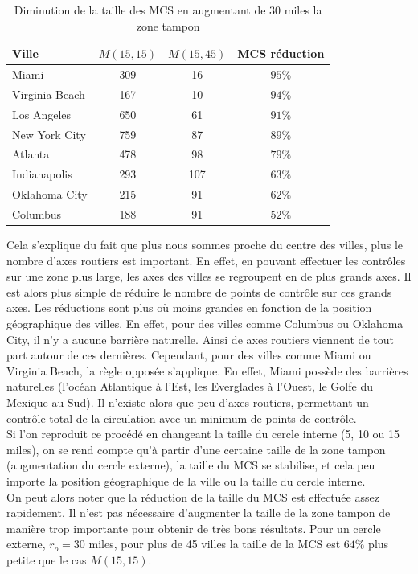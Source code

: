 \begin{table}[H]
 \centering
 \begin{tabular}{|l|c|c|c|}
    \toprule
    \textbf{Ville} & \textbf{$M(15,15)$} & \textbf{$M(15,45)$} & \textbf{MCS réduction}\\\midrule
    Miami & 309 & 16 & $95\%$ \\\hline
    Virginia Beach & 167 & 10 & $94\%$ \\\hline
    Los Angeles & 650 & 61 & $91\%$ \\\hline
    New York City & 759 & 87 & $89\%$ \\\hline
    Atlanta & 478 & 98 & $79\%$ \\\hline
    Indianapolis & 293 & 107 & $63\%$ \\\hline
    Oklahoma City & 215 & 91 & $62\%$ \\\hline
    Columbus & 188 & 91 & $52\%$ \\\bottomrule
 \end{tabular}
 \caption{Diminution de la taille des MCS en augmentant de 30 miles la zone tampon}
 \label{tab:1}
\end{table}
Cela s'explique du fait que plus nous sommes proche du centre des villes, plus le nombre d'axes routiers est important. En effet, en pouvant effectuer les contrôles sur une zone plus large, les axes des villes se regroupent en de plus grands axes. Il est alors plus simple de réduire le nombre de points de contrôle sur ces grands axes. Les réductions sont plus où moins grandes en fonction de la position géographique des villes. En effet, pour des villes comme Columbus ou Oklahoma City, il n'y a aucune barrière naturelle. Ainsi de axes routiers viennent de tout part autour de ces dernières. Cependant, pour des villes comme Miami ou Virginia Beach, la règle opposée s'applique. En effet, Miami possède des barrières naturelles (l'océan Atlantique à l'Est, les Everglades à l'Ouest, le Golfe du Mexique au Sud). Il n'existe alors que peu d'axes routiers, permettant un contrôle total de la circulation avec un minimum de points de contrôle.\\
Si l'on reproduit ce procédé en changeant la taille du cercle interne (5, 10 ou 15 miles), on se rend compte qu'à partir d'une certaine taille de la zone tampon (augmentation du cercle externe), la taille du MCS se stabilise, et cela peu importe la position géographique de la ville ou la taille du cercle interne.\\
On peut alors noter que la réduction de la taille du MCS est effectuée assez rapidement. Il n'est pas nécessaire d'augmenter la taille de la zone tampon de manière trop importante pour obtenir de très bons résultats. Pour un cercle externe, $r_o=30$ miles, pour plus de 45 villes la taille de la MCS est $64\%$ plus petite que le cas $M(15,15)$.\\~\\\par
